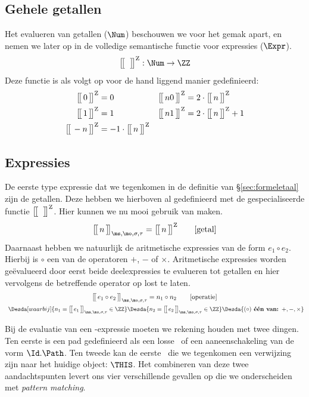\subsection{Gehele getallen}

Het evalueren van getallen ($\Num$) beschouwen we voor het gemak apart, en nemen we later op in de volledige semantische functie voor expressies ($\Expr$).
%
\begin{equation*}
  \Express[Z]{\;}{} : \Num \to \ZZ \\
\end{equation*}
%
Deze functie is als volgt op voor de hand liggend manier gedefinieerd:
%
\begin{align*}
  \Express[Z]{0}{} &= 0 &
  \Express[Z]{n 0}{} &= 2 \cdot \Express[Z]{n}{} \\
  \Express[Z]{1}{} &= 1 &
  \Express[Z]{n 1}{} &= 2 \cdot \Express[Z]{n}{} + 1 \\
  \Express[Z]{-n}{} &= -1 \cdot \Express[Z]{n}{}
\end{align*}

\subsection{Expressies}

De eerste type expressie dat we tegenkomen in de definitie van §\ref{sec:formeletaal} zijn de getallen. Deze hebben we hierboven al gedefinieerd met de gespecialiseerde functie $\Express[Z]{\;}{}$. Hier kunnen we nu mooi gebruik van maken.
%
\begin{equation*}
  \Express{n}{\ms,\mo,\sigma,\tau} = \Express[Z]{n}{}
  \tag*{[getal]}
\end{equation*}
%
Daarnaast hebben we natuurlijk de aritmetische expressies van de form $e_1 \circ e_2$. Hierbij is $\circ$ een van de operatoren $+$, $-$ of $\times$. Aritmetische expressies worden geëvalueerd door eerst beide deelexpressies te evalueren tot getallen en hier vervolgens de betreffende operator op lost te laten.
%
\begin{gather*}
  \Express{e_1 \circ e_2}{\ms,\mo,\sigma,\tau} = n_1 \circ n_2
  \tag*{[operatie]} \\
  \Desdas{
    \Desda[waarbij]{n_1 = \Express{e_1}{\ms,\mo,\sigma,\tau} \in \ZZ}
    \Desda{n_2 = \Express{e_2}{\ms,\mo,\sigma,\tau} \in \ZZ}
    \Desda{(\circ) \textbf{ één van: } +, -, \times}
  }
\end{gather*}

Bij de evaluatie van een \Path-expressie moeten we rekening houden met twee dingen. Ten eerste is een pad gedefinieerd als een losse \Id\ of een aaneenschakeling van de vorm $\Id.\Path$. Ten tweede kan de eerste \Id\ die we tegenkomen een verwijzing zijn naar het huidige object: $\THIS$. Het combineren van deze twee aandachtspunten levert ons vier verschillende gevallen op die we onderscheiden met \emph{pattern matching}.

